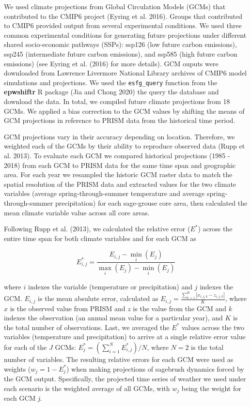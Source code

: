 \documentclass[
  12pt,
]{article}
\begin{document}
We used climate projections from Global Circulation Models (GCMs) that contributed to the CMIP6 project (Eyring et al. 2016).
Groups that contributed to CMIP6 provided output from several experimental conditions.
We used three common experimental conditions for generating future projections under different shared socio-economic pathways (SSPs): ssp126 (low future carbon emissions), ssp245 (intermediate future carbon emissions), and ssp585 (high future carbon emissions) (see Eyring et al. (2016) for more details).
GCM ouputs were downloaded from Lawrence Livermore National Library archives of CMIP6 model simulations and projections.
We used the \texttt{esfg\_query} function from the \textbf{epwshiftr} R package (Jia and Chong 2020) the query the database and download the data.
In total, we compiled future climate projections from 18 GCMs.
We applied a bias correction to the GCM values by shifting the means of GCM projections in reference to PRISM data from the historical time period.

GCM projections vary in their accuracy depending on location.
Therefore, we weighted each of the GCMs by their ability to reproduce observed data (Rupp et al. 2013).
To evaluate each GCM we compared historical projections (1985 - 2018) from each GCM to PRISM data for the same time span and geographic area.
For each year we resampled the historic GCM raster data to match the spatial resolution of the PRISM data and extracted values for the two climate variables (average spring-through-summer temperature and average spring-through-summer precipitation) for each sage-grouse core area, then calculated the mean climate variable value across all core areas.

Following Rupp et al. (2013), we calculated the relative error (\(E^*\)) across the entire time span for both climate variables and for each GCM as

\begin{equation}
E_{i,j}^* = \frac{E_{i,j} - \min\limits_{i}(E_{j})}{\max\limits_{i}(E_{j}) - \min\limits_i(E_{j})}
\end{equation}

\noindent{}where \(i\) indexes the variable (temperature or precipitation) and \(j\) indexes the GCM.
\(E_{i,j}\) is the mean absulute error, calculated as \(E_{i,j} = \frac{\sum_{k=1}^K|x_{i,j,k} - z_{i,j,k}|}{K}\), where \(x\) is the observed value from PRISM and \(z\) is the value from the GCM and \(k\) indexes the observation (an annual mean value for a particular year), and \(K\) is the total number of observations.
Last, we averaged the \(E^*\) values across the two variables (temperature and precipitation) to arrive at a single relative error value for each of the \(J\) GCMs: \(E_{j}^* = \left(\sum_{i=1}^N E_{i,j}^* \right) / N\), where \(N = 2\) is the total number of variables.
The resulting relative errors for each GCM were used as weights (\(w_j = 1 - E_j^*\)) when making projections of sagebrush dynamics forced by the GCM output.
Specifically, the projected time series of weather we used under each scenario is the weighted average of all GCMs, with \(w_j\) being the weight for each GCM \emph{j}.
\end{document}
